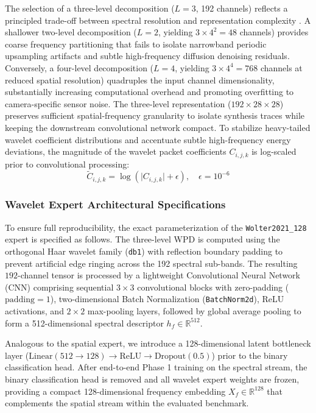 \documentclass[fleqn,10pt]{wlscirep}
\begin{document}
The selection of a three-level decomposition ($L=3$, 192 channels) reflects a principled trade-off between spectral resolution and representation complexity \cite{ref8}. A shallower two-level decomposition ($L=2$, yielding $3 \times 4^2 = 48$ channels) provides coarse frequency partitioning that fails to isolate narrowband periodic upsampling artifacts and subtle high-frequency diffusion denoising residuals. Conversely, a four-level decomposition ($L=4$, yielding $3 \times 4^4 = 768$ channels at reduced spatial resolution) quadruples the input channel dimensionality, substantially increasing computational overhead and promoting overfitting to camera-specific sensor noise. The three-level representation ($192 \times 28 \times 28$) preserves sufficient spatial-frequency granularity to isolate synthesis traces while keeping the downstream convolutional network compact. To stabilize heavy-tailed wavelet coefficient distributions and accentuate subtle high-frequency energy deviations, the magnitude of the wavelet packet coefficients $C_{i,j,k}$ is log-scaled prior to convolutional processing:
\begin{equation}
\tilde{C}_{i,j,k} = \log\left(\lvert C_{i,j,k} \rvert + \epsilon\right), \quad \epsilon = 10^{-6}
\end{equation}

\subsubsection*{Wavelet Expert Architectural Specifications}
To ensure full reproducibility, the exact parameterization of the \texttt{Wolter2021\_128} expert is specified as follows. The three-level WPD is computed using the orthogonal Haar wavelet family (\texttt{db1}) with reflection boundary padding to prevent artificial edge ringing across the 192 spectral sub-bands. The resulting $192$-channel tensor is processed by a lightweight Convolutional Neural Network (CNN) comprising sequential $3 \times 3$ convolutional blocks with zero-padding ($\text{padding}=1$), two-dimensional Batch Normalization (\texttt{BatchNorm2d}), ReLU activations, and $2 \times 2$ max-pooling layers, followed by global average pooling to form a 512-dimensional spectral descriptor $h_f \in \mathbb{R}^{512}$.

Analogous to the spatial expert, we introduce a 128-dimensional latent bottleneck layer ($\text{Linear}(512 \to 128) \to \text{ReLU} \to \text{Dropout}(0.5)$) prior to the binary classification head. After end-to-end Phase 1 training on the spectral stream, the binary classification head is removed and all wavelet expert weights are frozen, providing a compact 128-dimensional frequency embedding $X_f \in \mathbb{R}^{128}$ that complements the spatial stream within the evaluated benchmark.
\end{document}
